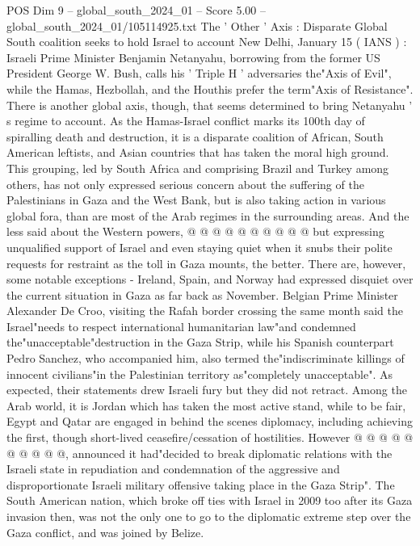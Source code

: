 \begin{textsample}{POS Dim 9 – global\_south\_2024\_01 – Score 5.00 – global\_south\_2024\_01/105114925.txt}  \label{ex:f9_pos_067}
The ' Other ' Axis : Disparate Global South coalition seeks to hold Israel to account New Delhi, January 15 ( IANS ) : Israeli Prime Minister Benjamin Netanyahu, borrowing from the former US President George W.
Bush, calls his ' Triple H ' adversaries the"Axis of Evil", while the Hamas, Hezbollah, and the Houthis prefer the term"Axis of Resistance".
There is another global axis, though, that seems determined to bring Netanyahu ' s regime to account.
As the Hamas-Israel conflict marks its 100th day of spiralling death and destruction, it is a disparate coalition of African, South American leftists, and Asian countries that has taken the moral high ground.
This grouping, led by South Africa and comprising Brazil and Turkey among others, has not only expressed serious concern about the suffering of the Palestinians in Gaza and the West Bank, but is also taking action in various global fora, than are most of the Arab regimes in the surrounding areas.
And the less said about the Western powers, @ @ @ @ @ @ @ @ @ @ but expressing unqualified support of Israel and even staying quiet when it snubs their polite requests for restraint as the toll in Gaza mounts, the better.
There are, however, some notable exceptions - Ireland, Spain, and Norway had expressed disquiet over the current situation in Gaza as far back as November.
Belgian Prime Minister Alexander De Croo, visiting the Rafah border crossing the same month said the Israel"needs to respect international humanitarian law"and condemned the"unacceptable"destruction in the Gaza Strip, while his Spanish counterpart Pedro Sanchez, who accompanied him, also termed the"indiscriminate killings of innocent civilians"in the Palestinian territory as"completely unacceptable".
As expected, their statements drew Israeli fury but they did not retract.
Among the Arab world, it is Jordan which has taken the most active stand, while to be fair, Egypt and Qatar are engaged in behind the scenes diplomacy, including achieving the first, though short-lived ceasefire/cessation of hostilities.
However @ @ @ @ @ @ @ @ @ @, announced it had"decided to break diplomatic relations with the Israeli state in repudiation and condemnation of the aggressive and disproportionate Israeli military offensive taking place in the Gaza Strip".
The South American nation, which broke off ties with Israel in 2009 too after its Gaza invasion then, was not the only one to go to the diplomatic extreme step over the Gaza conflict, and was joined by Belize.

\end{textsample}
